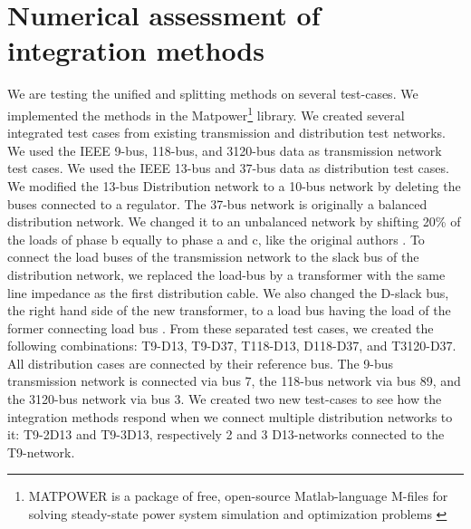 \documentclass[10pt,journal]{article}
\begin{document}
\section{Numerical assessment of integration methods}
We are testing the unified and splitting methods on several test-cases. We implemented the methods in the Matpower\footnote{MATPOWER is a package of free, open-source Matlab-language M-files for solving steady-state power system simulation and optimization problems \cite{Zimmerman2011}}  library. We created several integrated test cases from existing transmission and distribution test networks. We used the IEEE 9-bus, 118-bus, and 3120-bus data as transmission network test cases. We used the IEEE 13-bus and 37-bus data as distribution test cases. We modified the 13-bus Distribution network to a 10-bus network by deleting the buses connected to a regulator. The 37-bus network is originally a balanced distribution network. We changed it to an unbalanced network by shifting 20\% of the loads of phase b equally to phase a and c, like the original authors \cite{Taranto2008}. \newline
To connect the load buses of the transmission network to the slack bus of the distribution network, we replaced the load-bus by a transformer with the same line impedance as the first distribution cable. We also changed the D-slack bus, the right hand side of the new transformer, to a load bus having the load of the former connecting load bus \cite{Taranto2008}. \newline
From these separated test cases, we created the following combinations: T9-D13, T9-D37, T118-D13, D118-D37, and T3120-D37. All distribution cases are connected by their reference bus. The 9-bus transmission network is connected via bus 7, the 118-bus network via bus 89, and the 3120-bus network via bus 3. We created two new test-cases to see how the integration methods respond when we connect multiple distribution networks to it:  T9-2D13 and T9-3D13, respectively 2 and 3 D13-networks connected to the T9-network. 
\end{document}
